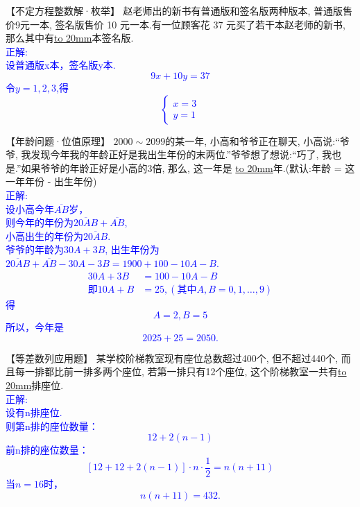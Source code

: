 \item {
    【不定方程整数解·枚举】
    赵老师出的新书有普通版和签名版两种版本, 普通版售价9元一本, 签名版售价 10 元一本.有一位顾客花 37 元买了若干本赵老师的新书, 那么其中有\underline{\hbox to 20mm{}}本签名版.
    \ifshowSolution{}
        \fangsong{}\textcolor{blue}{
            \\正解:\\
            设普通版x本，签名版y本.\\
            \[9x + 10y = 37\]
            令$y=1, 2, 3$,得
            \[\left\{\begin{array}{l}
                    x = 3 \\
                    y = 1 
            \end{array}\right.\]
        }
    \else
        \vspace{2cm}
    \fi
}

\item {
    【年龄问题·位值原理】
    $2000\sim 2099$的某一年, 小高和爷爷正在聊天, 小高说:``爷爷, 我发现今年我的年龄正好是我出生年份的末两位.''爷爷想了想说:``巧了, 我也是.''如果爷爷的年龄正好是小高的3倍, 那么, 这一年是  \underline{\hbox to 20mm{}}年.(默认:年龄 = 这一年年份 - 出生年份)
    \ifshowSolution{}
        \fangsong{}\textcolor{blue}{
            \\正解:\\
            设小高今年$\overline{AB}$岁，\\
            则今年的年份为$\overline{20AB} + \overline{AB}$, \\
            小高出生的年份为$\overline{20AB}$.\\
            爷爷的年龄为$30A + 3B$, 出生年份为$\overline{20AB} + \overline{AB} - 30A - 3B = 1900+100-10A-B$.\\
            \begin{align*}
                30A + 3B &= 100 - 10A- B \\
                即 10A + B &= 25, (其中A,B = 0,1,\ldots, 9)
            \end{align*}
            得
            \[ A=2, B=5 \]
            所以，今年是
            \[ 2025 + 25 = 2050. \]
        }
    \else
        \vspace{2cm}
    \fi
}

\item {
    【等差数列应用题】
    某学校阶梯教室现有座位总数超过400个, 但不超过440个, 而且每一排都比前一排多两个座位, 若第一排只有12个座位, 这个阶梯教室一共有\underline{\hbox to 20mm{}}排座位.
    \ifshowSolution{}
        \fangsong{}\textcolor{blue}{
            \\正解:\\
            设有n排座位.\\
            则第n排的座位数量：
            \[ 12+2(n-1) \]
            前n排的座位数量：
            \[ [12+12+2(n-1)]\cdot n \cdot \frac12 = n(n+11) \]
            当$n=16$时，
            \[ n(n+11) = 432. \]
        }
    \else
        \vspace{2cm}
    \fi
}

